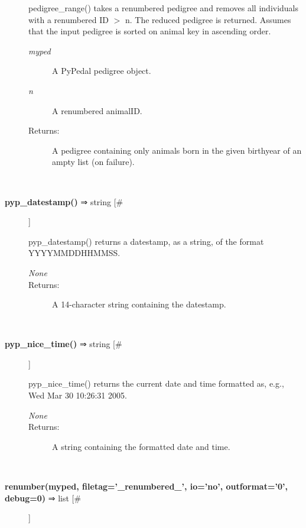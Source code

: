 \begin{description}
 pedigree\_range() takes a renumbered pedigree and removes all individuals with a renumbered ID $>$ n. The reduced pedigree is returned. Assumes that the input pedigree is sorted on animal key in ascending order.
\begin{description}
\item[\emph{myped}
] A PyPedal pedigree object.
\item[\emph{n}
] A renumbered animalID.
\item[Returns:] A pedigree containing only animals born in the given birthyear of an ampty list (on failure).

\end{description}
\\ 

\item[\textbf{pyp\_datestamp()}
 ⇒ string [\#]]

 pyp\_datestamp() returns a datestamp, as a string, of the format YYYYMMDDHHMMSS.
\begin{description}
\item[\emph{None}
]
\item[Returns:] A 14-character string containing the datestamp.

\end{description}
\\ 

\item[\textbf{pyp\_nice\_time()}
 ⇒ string [\#]]

 pyp\_nice\_time() returns the current date and time formatted as, e.g., Wed Mar 30 10:26:31 2005.
\begin{description}
\item[\emph{None}
]
\item[Returns:] A string containing the formatted date and time.

\end{description}
\\ 

\item[\textbf{renumber(myped, filetag='\_renumbered\_', io='no', outformat='0', debug=0)}
 ⇒ list [\#]]


\end{description}
